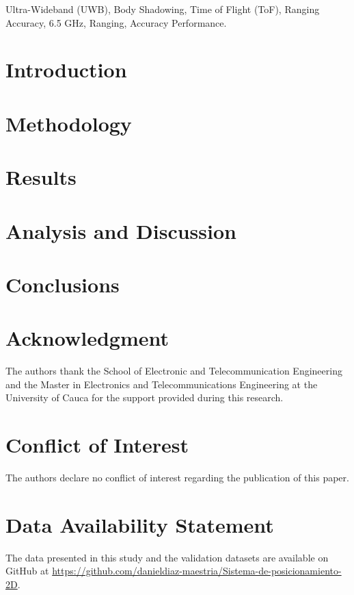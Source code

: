 \documentclass[journal,a4paper,twoside]{IEEEtran}
\begin{document}
\begin{IEEEkeywords}
Ultra-Wideband (UWB), Body Shadowing, Time of Flight (ToF), Ranging Accuracy, 6.5 GHz, Ranging, Accuracy Performance.
\end{IEEEkeywords}

\IEEEpeerreviewmaketitle

\section{Introduction}
\label{sec:introduction}


\section{Methodology}
\label{sec:methodology}


\section{Results}
\label{sec:results}


\section{Analysis and Discussion}
\label{sec:discussion}


\section{Conclusions}
\label{sec:conclusions}


\section*{Acknowledgment}
The authors thank the School of Electronic and Telecommunication Engineering and the Master in Electronics and Telecommunications Engineering at the University of Cauca for the support provided during this research.

\section*{Conflict of Interest}
The authors declare no conflict of interest regarding the publication of this paper.

\section*{Data Availability Statement}
The data presented in this study and the validation datasets are available on GitHub at \url{https://github.com/danieldiaz-maestria/Sistema-de-posicionamiento-2D}.
\end{document}
